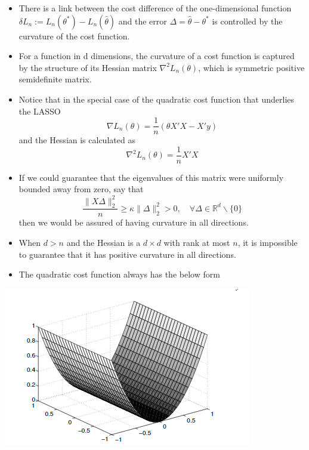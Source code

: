\documentclass[10pt,handout,english]{beamer}
\newcommand{\R}{\mathbb{R}}
\begin{document}
\begin{frame}[allowframebreaks]
\begin{itemize}
\setlength\itemsep{0.5em}
\item There is a link between the cost difference of the one-dimensional function $\delta L_{n}:=L_{n}(\theta^{*})-L_{n}(\hat{\theta})$ and the error $\Delta=\hat{\theta}-\theta^{*}$ is controlled by the curvature of the cost function. 
\justifying
\item For a function in d dimensions, the curvature of a cost function is captured by the structure of its Hessian matrix $\nabla^{2}L_{n}(\theta)$, which is symmetric positive semidefinite matrix.
\justifying
\item Notice that in the special case of the quadratic cost function that underlies the LASSO 
\[
\nabla L_{n}(\theta)=\frac{1}{n}(\theta X'X-X'y)
\]
and the Hessian is calculated as 
\[
\nabla^{2}L_{n}(\theta)=\frac{1}{n}X'X
\]
\item If we could guarantee that the eigenvalues of this matrix were uniformly bounded away from zero, say that
\[
\frac{\lVert X\Delta\rVert_{2}^{2}}{n}\geq\kappa\lVert\Delta\rVert_{2}^{2}>0,\quad\forall\Delta\in\R^{d}\backslash\{0\}
\]
then we would be assured of having curvature in all directions.
\item When $d>n$ and the Hessian is a $d\times d$ with rank at most $n$, it is impossible to guarantee that it has positive curvature in all directions. 
\justifying
\item The quadratic cost function always has the below form
\end{itemize}
\end{frame}
\begin{frame}
\includegraphics[width=\textwidth]{StrongConvex1.png}
\end{frame}
\end{document}
